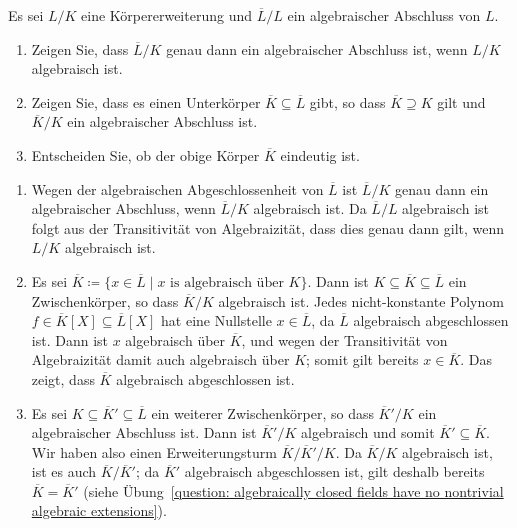 \begin{question}[subtitle = Algebraischen Abschlüsse von Unterkörpern]
  \label{question: transitivity of algebraic closure}
  Es sei $L/K$ eine Körpererweiterung und $\overline{L}/L$ ein algebraischer Abschluss von $L$.
  \begin{enumerate}
    \item
      Zeigen Sie, dass $\overline{L}/K$ genau dann ein algebraischer Abschluss ist, wenn $L/K$ algebraisch ist.
    \item
      Zeigen Sie, dass es einen Unterkörper $\overline{K} \subseteq \overline{L}$ gibt, so dass $\overline{K} \supseteq K$ gilt und $\overline{K}/K$ ein algebraischer Abschluss ist.
    \item
      Entscheiden Sie, ob der obige Körper $\overline{K}$ eindeutig ist.
  \end{enumerate}
\end{question}


\begin{solution}
  \begin{enumerate}
    \item
      Wegen der algebraischen Abgeschlossenheit von $\overline{L}$ ist $\overline{L}/K$ genau dann ein algebraischer Abschluss, wenn $\overline{L}/K$ algebraisch ist.
      Da $\overline{L}/L$ algebraisch ist folgt aus der Transitivität von Algebraizität, dass dies genau dann gilt, wenn $L/K$ algebraisch ist.
      
    \item
      Es sei $\overline{K} \coloneqq \{x \in \overline{L} \mid \text{$x$ is algebraisch über $K$}\}$.
      Dann ist $K \subseteq \overline{K} \subseteq \overline{L}$ ein Zwischenkörper, so dass $\overline{K}/K$ algebraisch ist.
      Jedes nicht-konstante Polynom $f \in \overline{K}[X] \subseteq \overline{L}[X]$ hat eine Nullstelle $x \in \overline{L}$, da $\overline{L}$ algebraisch abgeschlossen ist.
      Dann ist $x$ algebraisch über $\overline{K}$, und wegen der Transitivität von Algebraizität damit auch algebraisch über $K$;
      somit gilt bereits $x \in \overline{K}$.
      Das zeigt, dass $\overline{K}$ algebraisch abgeschlossen ist.
      
    \item
      Es sei $K \subseteq \overline{K}' \subseteq \overline{L}$ ein weiterer Zwischenkörper, so dass $\overline{K}'/K$ ein algebraischer Abschluss ist.
      Dann ist $\overline{K}'/K$ algebraisch und somit $\overline{K}' \subseteq \overline{K}$.
      Wir haben also einen Erweiterungsturm $\overline{K}/\overline{K}'/K$.
      Da $\overline{K}/K$ algebraisch ist, ist es auch $\overline{K}/\overline{K}'$;
      da $\overline{K}'$ algebraisch abgeschlossen ist, gilt deshalb bereits $\overline{K} = \overline{K}'$ (siehe Übung~\ref{question: algebraically closed fields have no nontrivial algebraic extensions}).
  \end{enumerate}
\end{solution}


